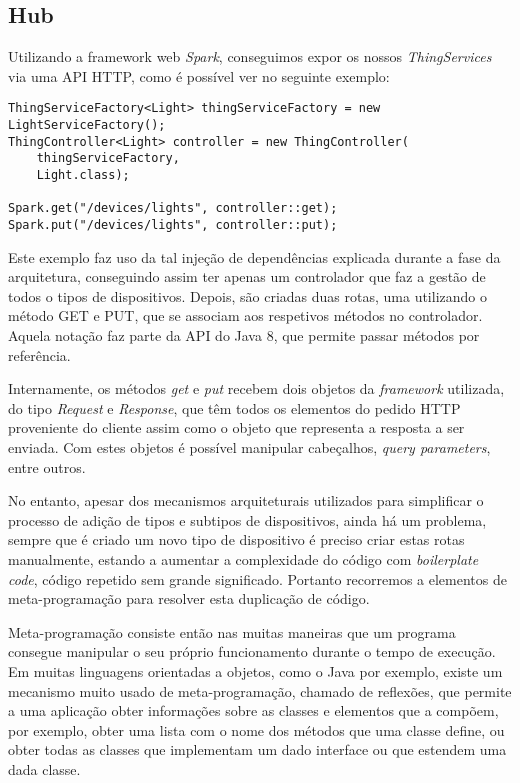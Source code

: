 \subsection{Hub}

Utilizando a framework web \textit{Spark}, conseguimos expor os nossos \textit{ThingServices} via uma API HTTP, como é possível ver no seguinte exemplo:

\begin{verbatim}
ThingServiceFactory<Light> thingServiceFactory = new LightServiceFactory();
ThingController<Light> controller = new ThingController(
    thingServiceFactory,
    Light.class);

Spark.get("/devices/lights", controller::get);
Spark.put("/devices/lights", controller::put);
\end{verbatim}

Este exemplo faz uso da tal injeção de dependências explicada durante a fase da arquitetura, conseguindo assim ter apenas um controlador que faz a gestão de todos o tipos de dispositivos. Depois, são criadas duas rotas, uma utilizando o método GET e PUT, que se associam aos respetivos métodos no controlador. Aquela notação faz parte da API do Java 8, que permite passar métodos por referência.

Internamente, os métodos \textit{get} e \textit{put} recebem dois objetos da \textit{framework} utilizada, do tipo \textit{Request} e \textit{Response}, que têm todos os elementos do pedido HTTP proveniente do cliente assim como o objeto que representa a resposta a ser enviada. Com estes objetos é possível manipular cabeçalhos, \textit{query parameters}, entre outros.

No entanto, apesar dos mecanismos arquiteturais utilizados para simplificar o processo de adição de tipos e subtipos de dispositivos, ainda há um problema, sempre que é criado um novo tipo de dispositivo é preciso criar estas rotas manualmente, estando a aumentar a complexidade do código com \textit{boilerplate code}, código repetido sem grande significado. Portanto recorremos a elementos de meta-programação para resolver esta duplicação de código.

Meta-programação consiste então nas muitas maneiras que um programa consegue manipular o seu próprio funcionamento durante o tempo de execução. Em muitas linguagens orientadas a objetos, como o Java por exemplo, existe um mecanismo muito usado de meta-programação, chamado de reflexões, que permite a uma aplicação obter informações sobre as classes e elementos que a compõem, por exemplo, obter uma lista com o nome dos métodos que uma classe define, ou obter todas as classes que implementam um dado interface ou que estendem uma dada classe.

